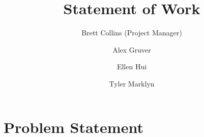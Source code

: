 \documentclass[proposal]{hmcclinic}
\title{Statement of Work}
\author{Brett Collins (Project Manager) \and Alex Gruver \and Ellen Hui \and
Tyler Marklyn}
\begin{document}

\maketitle








\section{Problem Statement}
\end{document}
